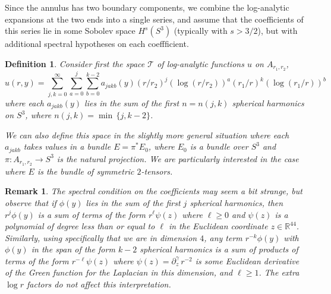\documentclass[12pt]{article}
\newtheorem{defn}[thm]{Definition}
\newtheorem{rem}[thm]{Remark}
\newcommand{\RR}{\mathbb R}
\newcommand{\del}{\partial}
\newcommand{\calT}{{\mathcal T}}
\begin{document}
Since the annulus has two boundary components, we combine the log-analytic expansions at the two ends into
a single series, and assume that the coefficients of this series lie in some Sobolev space $H^s( S^3)$
(typically with $s > 3/2$), but with additional spectral hypotheses on each coeffficient. 
\begin{defn}
Consider first the space $\calT$ of log-analytic functions $u$ on $A_{r_1, r_2}$,
\[
u(r,y) = \sum_{j, k = 0}^\infty \sum_{a = 0}^{j} \sum_{b=0}^{k-2}  a_{j a k b}(y) 
(r/r_2)^j ( \log (r/r_2))^a (r_1/r)^k (\log (r_1/r))^b
\]
where each $a_{j a k b }(y)$ lies in the sum of the first $n = n(j,k)$ spherical harmonics on $S^3$, where $n(j,k)
= \min \, \{ j, k-2\}$.  

We can also define this space in the slightly more general situation where each $a_{j a k b }$ takes values in a bundle $E = \pi^* E_0$, where
$E_0$ is a bundle over $S^3$ and $\pi: A_{r_1, r_2} \to S^3$ is the natural projection. We are 
particularly interested in the case where $E$ is the bundle of symmetric $2$-tensors. 
\end{defn}
\begin{rem}
The spectral condition on the coefficients may seem a bit strange, but observe that if $\phi(y)$ lies in the sum of the first $j$ spherical
harmonics, then $r^j \phi(y)$ is a sum of terms of the form $r^\ell \psi(z)$ where $\ell \geq 0$ and $\psi(z)$ 
is a polynomial of degree less than or equal to $\ell$ in the Euclidean coordinate $z \in \RR^44$. Similarly, using 
specifically that we are in dimension $4$, any term $r^{-k} \phi(y)$ with $\phi(y)$ in the span of the form $k-2$ 
spherical harmonics is a sum of products of terms of the form $r^{-\ell} \psi(z)$ where $\psi(z) = \del_z^\gamma \, r^{-2}$ 
is some Euclidean derivative of the Green function for the Laplacian in this dimension, and $\ell \geq 1$.  The extra $\log r$ 
factors do not affect this interpretation. 
\label{meaningT}
\end{rem}
\end{document}
